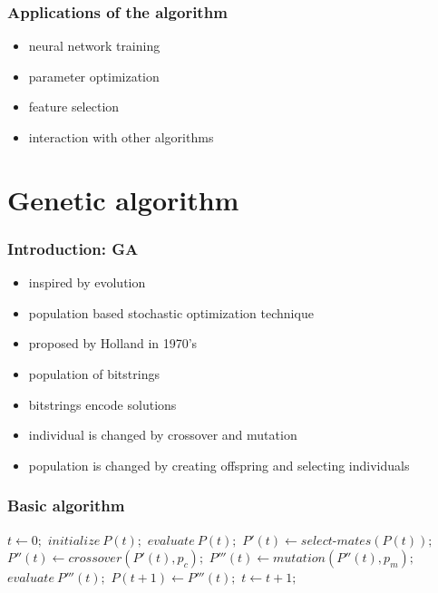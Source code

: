 \documentclass{beamer}
\begin{document}
\begin{frame}[fragile]
  \frametitle{Applications of the algorithm}
  \begin{itemize}
    \item neural network training
    \item parameter optimization
    \item feature selection
    \item interaction with other algorithms
  \end{itemize}
\end{frame}


\section{Genetic algorithm}

\begin{frame}[fragile]
  \frametitle{Introduction: GA}
  \begin{itemize}
    \item inspired by evolution
    \item population based stochastic optimization technique
    \item proposed by Holland in 1970's
  \end{itemize}
  
  \bigskip
  \begin{itemize}
    \item population of bitstrings 
    \item bitstrings encode solutions
    \item individual is changed by crossover and mutation
    \item population is changed by creating offspring and selecting individuals
  \end{itemize}

\end{frame}

\begin{frame}[fragile]
  \frametitle{Basic algorithm}
  \begin{algorithmic}
    \STATE $t \gets 0;$
    \STATE $initialize\: P(t);$
    \STATE $evaluate\: P(t);$
    \REPEAT
      \STATE $P'(t) \gets select\mbox{-}mates(P(t));$
      \STATE $P''(t) \gets crossover(P'(t), p_c);$
      \STATE $P'''(t) \gets mutation(P''(t), p_m);$
      \STATE $evaluate\: P'''(t);$
      \STATE $P(t+1) \gets P'''(t);$
      \STATE $t \gets t + 1;$
  \end{algorithmic}
\end{frame}
\end{document}

